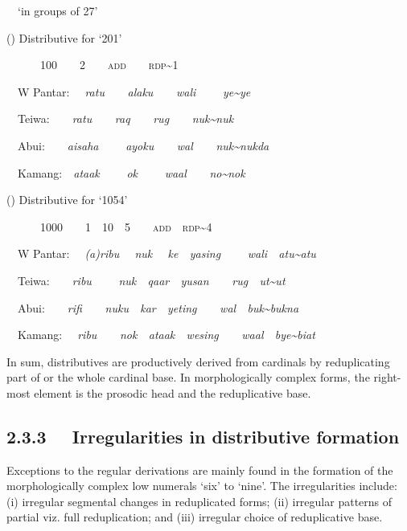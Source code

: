 \ \ {\textquoteleft}in groups of 27{\textquoteright} 

\label{bkm:Ref342656299}() Distributive for {\textquoteleft}201{\textquoteright} 

\ \ \ \ \ \ 100\ \ \ \ 2\ \ \ \ \textsc{add\ \ \ \ rdp}\~{}1

\ \ W Pantar:\textit{ \ \ }\textit{ratu\ \ \ \ alaku\ \ \ \ wali \ \ \ \ ye\~{}ye}

\ \ Teiwa:\ \ \ \ \textit{ratu\ \ \ \ raq\ \ \ \ rug\ \ \ \ nuk}\textit{\~{}}\textit{nuk}

\ \ Abui:\ \ \ \ \textit{aisaha \ \ \ \ ayoku\ \ \ \ wal\ \ \ \ nuk\~{}nukda }

\ \ Kamang:\ \ \textit{ataak \ \ \ \ ok \ \ \ \ waal\ \ \ \ no\~{}nok}

\label{bkm:Ref342744393}() Distributive for {\textquoteleft}1054{\textquoteright}

\ \ \ \ \ \ 1000\ \ \ \ 1\ \ 10\ \ 5\ \ \ \ \textsc{add\ \ rdp}\~{}4

\ \ W Pantar:\textit{ \ \ }\textit{(a)ribu \ \ nuk \ \ ke\ \ yasing \ \ \ \ wali\ \ atu}\textit{\~{}}\textit{atu }

\ \ Teiwa:\ \ \ \ \textit{ribu \ \ \ \ nuk\ \ qaar\ \ yusan\ \ \ \ rug\ \ ut}\textit{\~{}}\textit{ut}

\ \ Abui:\ \ \ \ \textit{rifi\ \ \ \ nuku\ \ kar\ \ yeting\ \ \ \ wal\ \ buk\~{}bukna}

\ \ Kamang:\textit{ \ \ }\textit{ribu\ \ \ \ nok\ \ ataak\ \ wesing\ \ \ \ waal\ \ bye\~{}biat}

In sum, distributives are productively derived from cardinals by reduplicating part of or the whole cardinal base. In morphologically complex forms, the right-most element is the prosodic head and the reduplicative base. 

\subsection[2.3.3 \ \ Irregularities in distributive formation]{\textmd{2.3.3 \ \ Irregularities in distributive formation}}
\hypertarget{RefHeading105242871885726}{}Exceptions to the regular derivations are mainly found in the formation of the morphologically complex low numerals {\textquoteleft}six{\textquoteright} to {\textquoteleft}nine{\textquoteright}. The irregularities include: (i) irregular segmental changes in reduplicated forms; (ii) irregular patterns of partial viz. full reduplication; and (iii) irregular choice of reduplicative base. 

